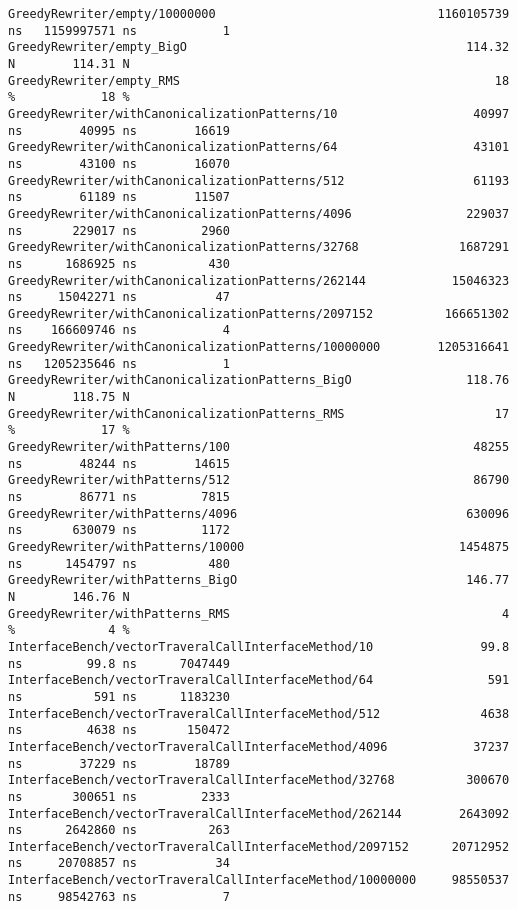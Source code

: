 \begin{code}
\begin{verbatim}
GreedyRewriter/empty/10000000                               1160105739 ns   1159997571 ns            1
GreedyRewriter/empty_BigO                                       114.32 N        114.31 N
GreedyRewriter/empty_RMS                                            18 %            18 %
GreedyRewriter/withCanonicalizationPatterns/10                   40997 ns        40995 ns        16619
GreedyRewriter/withCanonicalizationPatterns/64                   43101 ns        43100 ns        16070
GreedyRewriter/withCanonicalizationPatterns/512                  61193 ns        61189 ns        11507
GreedyRewriter/withCanonicalizationPatterns/4096                229037 ns       229017 ns         2960
GreedyRewriter/withCanonicalizationPatterns/32768              1687291 ns      1686925 ns          430
GreedyRewriter/withCanonicalizationPatterns/262144            15046323 ns     15042271 ns           47
GreedyRewriter/withCanonicalizationPatterns/2097152          166651302 ns    166609746 ns            4
GreedyRewriter/withCanonicalizationPatterns/10000000        1205316641 ns   1205235646 ns            1
GreedyRewriter/withCanonicalizationPatterns_BigO                118.76 N        118.75 N
GreedyRewriter/withCanonicalizationPatterns_RMS                     17 %            17 %
GreedyRewriter/withPatterns/100                                  48255 ns        48244 ns        14615
GreedyRewriter/withPatterns/512                                  86790 ns        86771 ns         7815
GreedyRewriter/withPatterns/4096                                630096 ns       630079 ns         1172
GreedyRewriter/withPatterns/10000                              1454875 ns      1454797 ns          480
GreedyRewriter/withPatterns_BigO                                146.77 N        146.76 N
GreedyRewriter/withPatterns_RMS                                      4 %             4 %
InterfaceBench/vectorTraveralCallInterfaceMethod/10               99.8 ns         99.8 ns      7047449
InterfaceBench/vectorTraveralCallInterfaceMethod/64                591 ns          591 ns      1183230
InterfaceBench/vectorTraveralCallInterfaceMethod/512              4638 ns         4638 ns       150472
InterfaceBench/vectorTraveralCallInterfaceMethod/4096            37237 ns        37229 ns        18789
InterfaceBench/vectorTraveralCallInterfaceMethod/32768          300670 ns       300651 ns         2333
InterfaceBench/vectorTraveralCallInterfaceMethod/262144        2643092 ns      2642860 ns          263
InterfaceBench/vectorTraveralCallInterfaceMethod/2097152      20712952 ns     20708857 ns           34
InterfaceBench/vectorTraveralCallInterfaceMethod/10000000     98550537 ns     98542763 ns            7

\end{verbatim}
\end{code}
